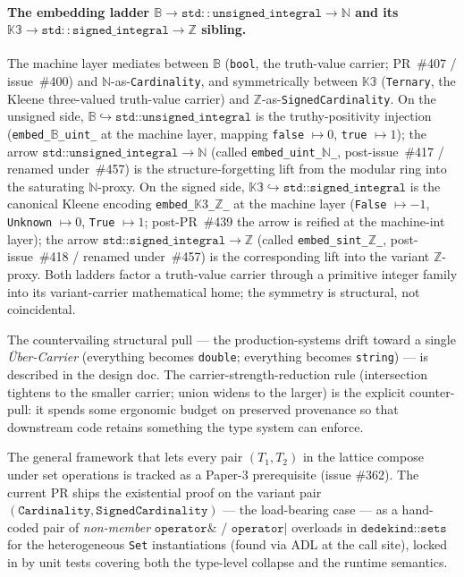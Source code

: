 \documentclass[11pt, a4paper]{report}
\begin{document}
\paragraph{The embedding ladder $\mathbb{B} \to \mathtt{std::unsigned\_integral} \to \mathbb{N}$ and its $\mathbb{K3} \to \mathtt{std::signed\_integral} \to \mathbb{Z}$ sibling.} The machine layer mediates between $\mathbb{B}$ (\texttt{bool}, the truth-value carrier; PR~\#407 / issue~\#400) and $\mathbb{N}$-as-\texttt{Cardinality}, and symmetrically between $\mathbb{K3}$ (\texttt{Ternary}, the Kleene three-valued truth-value carrier) and $\mathbb{Z}$-as-\texttt{SignedCardinality}. On the unsigned side, $\mathbb{B} \hookrightarrow \texttt{std::unsigned\_integral}$ is the truthy-positivity injection (\texttt{embed\_}$\mathbb{B}$\texttt{\_uint\_} at the machine layer, mapping \texttt{false} $\mapsto 0$, \texttt{true} $\mapsto 1$); the arrow $\texttt{std::unsigned\_integral} \to \mathbb{N}$ (called \texttt{embed\_uint\_}$\mathbb{N}$\texttt{\_}, post-issue~\#417 / renamed under~\#457) is the structure-forgetting lift from the modular ring into the saturating $\mathbb{N}$-proxy. On the signed side, $\mathbb{K3} \hookrightarrow \texttt{std::signed\_integral}$ is the canonical Kleene encoding \texttt{embed\_}$\mathbb{K}3$\texttt{\_}$\mathbb{Z}$\texttt{\_} at the machine layer (\texttt{False} $\mapsto -1$, \texttt{Unknown} $\mapsto 0$, \texttt{True} $\mapsto 1$; post-PR~\#439 the arrow is reified at the machine-int layer); the arrow $\texttt{std::signed\_integral} \to \mathbb{Z}$ (called \texttt{embed\_sint\_}$\mathbb{Z}$\texttt{\_}, post-issue~\#418 / renamed under~\#457) is the corresponding lift into the variant $\mathbb{Z}$-proxy. Both ladders factor a truth-value carrier through a primitive integer family into its variant-carrier mathematical home; the symmetry is structural, not coincidental.

The countervailing structural pull --- the production-systems drift toward a single \emph{Über-Carrier} (everything becomes \texttt{double}; everything becomes \texttt{string}) --- is described in the design doc. The carrier-strength-reduction rule (intersection tightens to the smaller carrier; union widens to the larger) is the explicit counter-pull: it spends some ergonomic budget on preserved provenance so that downstream code retains something the type system can enforce.

The general framework that lets every pair $(T_1, T_2)$ in the lattice compose under set operations is tracked as a Paper-3 prerequisite (issue \#362). The current PR ships the existential proof on the variant pair $(\texttt{Cardinality}, \texttt{SignedCardinality})$ --- the load-bearing case --- as a hand-coded pair of \emph{non-member} $\texttt{operator\&}$ / $\texttt{operator|}$ overloads in $\texttt{dedekind::sets}$ for the heterogeneous \texttt{Set} instantiations (found via ADL at the call site), locked in by unit tests covering both the type-level collapse and the runtime semantics.
\end{document}
